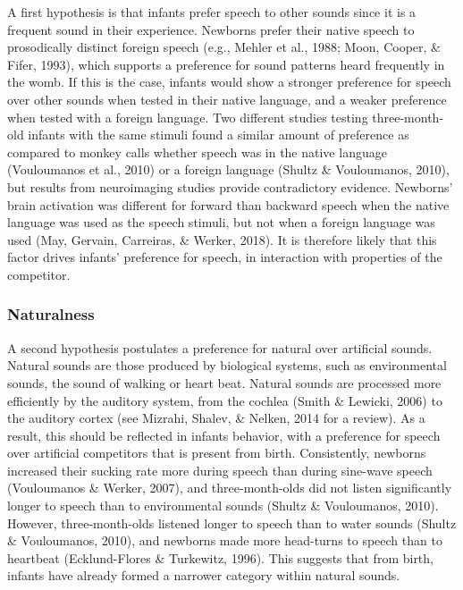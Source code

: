 \documentclass[man]{apa6}
\begin{document}
A first hypothesis is that infants prefer speech to other sounds since it is a frequent sound in their experience. Newborns prefer their native speech to prosodically distinct foreign speech (e.g., Mehler et al., 1988; Moon, Cooper, \& Fifer, 1993), which supports a preference for sound patterns heard frequently in the womb. If this is the case, infants would show a stronger preference for speech over other sounds when tested in their native language, and a weaker preference when tested with a foreign language. Two different studies testing three-month-old infants with the same stimuli found a similar amount of preference as compared to monkey calls whether speech was in the native language (Vouloumanos et al., 2010) or a foreign language (Shultz \& Vouloumanos, 2010), but results from neuroimaging studies provide contradictory evidence. Newborns' brain activation was different for forward than backward speech when the native language was used as the speech stimuli, but not when a foreign language was used (May, Gervain, Carreiras, \& Werker, 2018). It is therefore likely that this factor drives infants' preference for speech, in interaction with properties of the competitor.

\hypertarget{naturalness}{%
\subsubsection{Naturalness}\label{naturalness}}

A second hypothesis postulates a preference for natural over artificial sounds. Natural sounds are those produced by biological systems, such as environmental sounds, the sound of walking or heart beat. Natural sounds are processed more efficiently by the auditory system, from the cochlea (Smith \& Lewicki, 2006) to the auditory cortex (see Mizrahi, Shalev, \& Nelken, 2014 for a review). As a result, this should be reflected in infants behavior, with a preference for speech over artificial competitors that is present from birth. Consistently, newborns increased their sucking rate more during speech than during sine-wave speech (Vouloumanos \& Werker, 2007), and three-month-olds did not listen significantly longer to speech than to environmental sounds (Shultz \& Vouloumanos, 2010). However, three-month-olds listened longer to speech than to water sounds (Shultz \& Vouloumanos, 2010), and newborns made more head-turns to speech than to heartbeat (Ecklund-Flores \& Turkewitz, 1996). This suggests that from birth, infants have already formed a narrower category within natural sounds.
\end{document}
